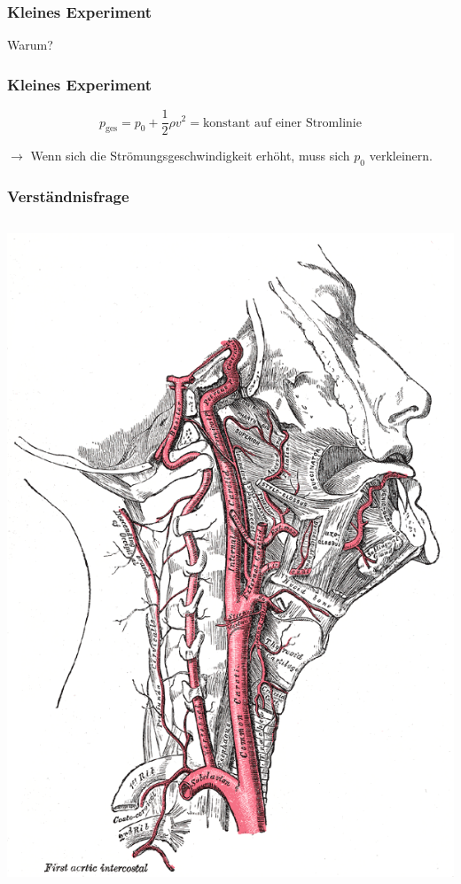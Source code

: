 \documentclass{beamer}
\begin{document}
\begin{frame}
\frametitle{Kleines Experiment}

\pause

Warum? 

\end{frame}



\begin{frame}
\frametitle{Kleines Experiment}

\[
p_{\text{ges}} = p_0 + \frac{1}{2}\rho v^2 = \text{konstant auf einer Stromlinie}
\]

\(\rightarrow\) Wenn sich die Strömungsgeschwindigkeit erhöht, muss sich \(p_0\) verkleinern.
\end{frame}


\begin{frame}
\frametitle{Verständnisfrage}

\begin{columns}[c]
\begin{column}{5cm}
\begin{center}
\includegraphics[width=\textwidth]{halsarterien.png}
\end{center}
\end{column}


\end{columns}
\end{frame}
\end{document}

